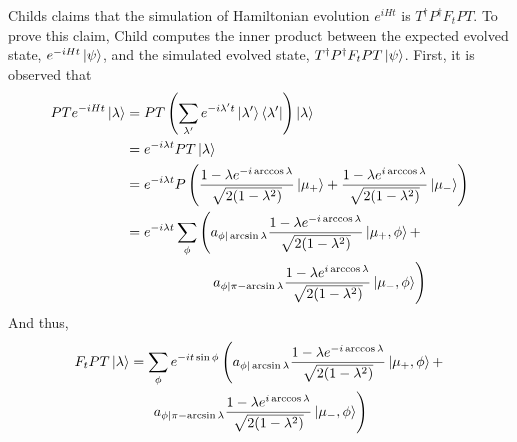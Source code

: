 \documentclass[
10pt, %
a4paper, %
oneside, %
headinclude,footinclude, %
BCOR5mm, %
]{scrartcl}
\begin{document}
Childs claims that the simulation of Hamiltonian evolution $e^{iHt}$ is $T^{\dagger}P^{\dagger}F_tPT$. To prove this claim, Child computes the inner product between the expected evolved state, $e^{-iHt}\ket\psi$, and the simulated evolved state, $T^{\dagger}P^{\dagger}F_tPT\ket\psi$. First, it is observed that
\begin{align*}
PTe^{-iHt}\ket\lambda&=PT\left(\sum_{\lambda'}e^{-i\lambda't}\ket{\lambda'}\bra{\lambda'}\right)\ket\lambda\\
&=e^{-i\lambda t}PT\ket\lambda\\
&=e^{-i\lambda t}P\left(\frac{1-\lambda e^{-i\arccos\lambda}}{\sqrt{2(1-\lambda^2)}}\ket{\mu_+}+\frac{1-\lambda e^{i\arccos\lambda}}{\sqrt{2(1-\lambda^2)}}\ket{\mu_-}\right)\\
&=e^{-i\lambda t}\sum_\phi\left(a_{\phi|\arcsin\lambda}\frac{1-\lambda e^{-i\arccos\lambda}}{\sqrt{2(1-\lambda^2)}}\ket{\mu_+,\phi}+\right.\\
&\qquad\qquad\qquad \left.a_{\phi|\pi-\arcsin\lambda}\frac{1-\lambda e^{i\arccos\lambda}}{\sqrt{2(1-\lambda^2)}}\ket{\mu_-,\phi}\right)\end{align*}
And thus,
\begin{multline*}
F_tPT\ket\lambda=\sum_\phi e^{-it\sin\phi}\left(a_{\phi|\arcsin\lambda}\frac{1-\lambda e^{-i\arccos\lambda}}{\sqrt{2(1-\lambda^2)}}\ket{\mu_+,\phi}+\right.\\
\left.a_{\phi|\pi-\arcsin\lambda}\frac{1-\lambda e^{i\arccos\lambda}}{\sqrt{2(1-\lambda^2)}}\ket{\mu_-,\phi}\right)
\end{multline*}
\end{document}
